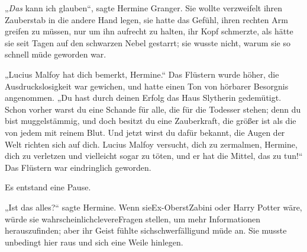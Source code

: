 „\emph{Das} kann ich glauben“, sagte Hermine Granger. Sie wollte verzweifelt ihren Zauberstab in die andere Hand legen, sie hatte das Gefühl, ihren rechten Arm greifen zu müssen, nur um ihn aufrecht zu halten, ihr Kopf schmerzte, als hätte sie seit Tagen auf den schwarzen Nebel gestarrt; sie wusste nicht, warum sie so schnell müde geworden war.

„Lucius Malfoy hat dich bemerkt, Hermine.“ Das Flüstern wurde höher, die Ausdruckslosigkeit war gewichen, und hatte einen Ton von hörbarer Besorgnis angenommen. „Du hast durch deinen Erfolg das Haus Slytherin gedemütigt. Schon vorher warst du eine Schande für alle, die für die Todesser stehen; denn du bist muggelstämmig, und doch besitzt du eine Zauberkraft, die größer ist als die von jedem mit reinem Blut. Und jetzt wirst du dafür bekannt, die Augen der Welt richten sich auf dich. Lucius Malfoy versucht, dich zu zermalmen, Hermine, dich zu verletzen und vielleicht sogar zu töten, und er hat die Mittel, das zu tun!“ Das Flüstern war eindringlich geworden.

Es entstand eine Pause.

„Ist das alles?“ sagte Hermine. Wenn sieEx-OberstZabini oder Harry Potter wäre, würde sie wahrscheinlichclevereFragen stellen, um mehr Informationen herauszufinden; aber ihr Geist fühlte sichschwerfälligund müde an. Sie musste unbedingt hier raus und sich eine Weile hinlegen.

